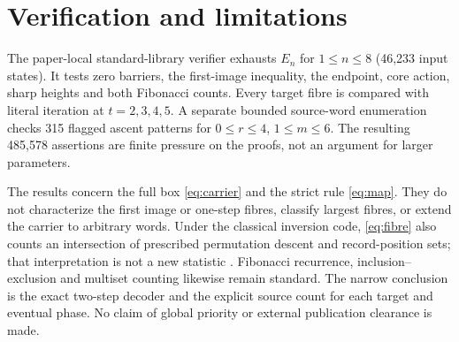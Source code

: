\section{Verification and limitations}
The paper-local standard-library verifier exhausts $E_n$ for $1\le n\le8$
(46,233 input states). It tests zero barriers, the first-image inequality,
the endpoint, core action, sharp heights and both Fibonacci counts.
Every target fibre is compared with literal iteration at $t=2,3,4,5$.
A separate bounded source-word enumeration checks 315 flagged ascent
patterns for $0\le r\le4$, $1\le m\le6$. The resulting 485,578 assertions
are finite pressure on the proofs, not an argument for larger parameters.

The results concern the full box \eqref{eq:carrier} and the strict rule
\eqref{eq:map}. They do not characterize the first image or one-step
fibres, classify largest fibres, or extend the carrier to arbitrary words.
Under the classical inversion code, \eqref{eq:fibre} also counts an
intersection of prescribed permutation descent and record-position sets;
that interpretation is not a new statistic \citep{Lin2018Sextuple}.
Fibonacci recurrence, inclusion--exclusion and multiset counting likewise
remain standard. The narrow conclusion is the exact two-step decoder and
the explicit source count for each target and eventual phase. No claim of
global priority or external publication clearance is made.
